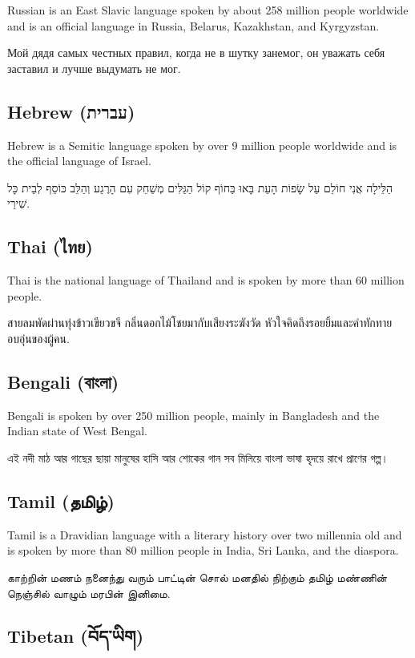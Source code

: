 \documentclass{article}
\begin{document}
Russian is an East Slavic language spoken by about 258 million people worldwide and is an official language in Russia, Belarus, Kazakhstan, and Kyrgyzstan.

Мой дядя самых честных правил,
когда не в шутку занемог,
он уважать себя заставил
и лучше выдумать не мог.

\subsection{Hebrew ({\hebrewfont עברית})}\label{hebrew}

Hebrew is a Semitic language spoken by over 9 million people worldwide and is the official language of Israel.

הַלֵּילָה אֲנִי חוֹלֵם עַל שָׂפוֹת הָעֵת בָּאוּ בַּחוֹף
קוֹל הַגַּלִּים מְשַׁחֵק עִם הָרֶגַע
וְהַלֵּב כּוֹסֵף לְבֵית כָּל שִׁירַי.

\subsection{Thai ({\thaifont ไทย})}\label{thai}

Thai is the national language of Thailand and is spoken by more than 60 million people.

สายลมพัดผ่านทุ่งข้าวเขียวขจี
กลิ่นดอกไม้โชยมากับเสียงระฆังวัด
หัวใจคิดถึงรอยยิ้มและคำทักทายอบอุ่นของผู้คน.

\subsection{Bengali ({\bengalifont বাংলা})}\label{bengali}

Bengali is spoken by over 250 million people, mainly in Bangladesh and the Indian state of West Bengal.

এই নদী মাঠ আর গাছের ছায়া
মানুষের হাসি আর শোকের গান
সব মিলিয়ে বাংলা ভাষা হৃদয়ে রাখে প্রাণের গল্প।

\subsection{Tamil ({\tamilfont தமிழ்})}\label{tamil}

Tamil is a Dravidian language with a literary history over two millennia old and is spoken by more than 80 million people in India, Sri Lanka, and the diaspora.

காற்றின் மணம் நனைந்து வரும்
பாட்டின் சொல் மனதில் நிற்கும்
தமிழ் மண்ணின் நெஞ்சில் வாழும் மரபின் இனிமை.

\subsection{Tibetan ({\tibetanfont བོད་ཡིག})}\label{tibetan}
\end{document}
